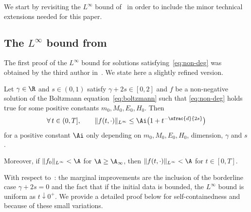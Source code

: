 We start by revisiting the $L^\infty$ bound
of~\cite{luis} in order to include the minor technical extensions
needed for this paper.

\subsection{The $L^\infty$ bound from \cite{luis}}

The first proof of the $L^\infty$ bound for solutions
satisfying~\eqref{eq:non-deg} was obtained by the third author
in~\cite[Th.\,1.2]{luis}. We state here a slightly refined version.

\begin{thm} \label{thm:linfty} Let
$\gamma \in \R$ and $s \in (0,1)$ satisfy $\gamma +2s \in [0,2]$ and
$f$ be a non-negative solution of the Boltzmann
equation~\eqref{eq:boltzmann} such that \eqref{eq:non-deg} holds
true for some positive constants $m_0,M_0,E_0,H_0$. Then
\[ \forall \, t \in (0,T], \qquad \|f(t,\cdot)\|_{L^\infty} \le \Ai
\bigl(1+ t^{-\sfrac{d}{2s}}\bigr) \] for a positive constant $\Ai$
only depending on $m_0,M_0,E_0,H_0$, dimension, $\gamma$ and $s$.

Moreover, if $\|f_0\|_{L^\infty} < \A$ for $\A \ge \A_\infty$, then $\|f(t,\cdot)\|_{L^\infty} < \A$ for $t\in[0,T]$.
\end{thm}

\begin{remark}
With respect to~\cite[Th.\,1.2]{luis}: the marginal improvements
are the inclusion of the borderline case $\gamma+2s=0$ and the fact
that if the initial data is bounded, the $L^\infty$ bound is uniform
as $t \downarrow 0^+$. We provide a detailed proof below for
self-containedness and because of these small variations.
\end{remark}

